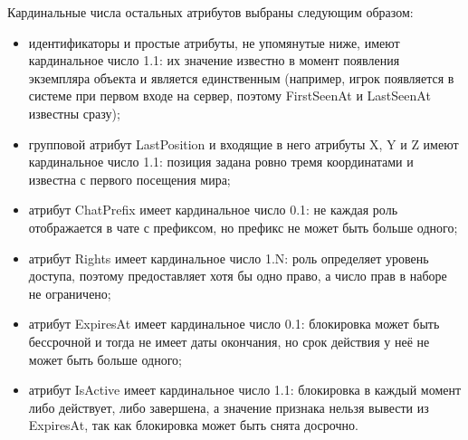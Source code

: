 \documentclass[a4paper, 14pt]{extarticle}
\begin{document}
Кардинальные числа остальных атрибутов выбраны следующим образом:
\begin{itemize}
    \item идентификаторы и простые атрибуты, не упомянутые ниже, имеют кардинальное число 1.1: их значение известно в момент появления экземпляра объекта и является единственным (например, игрок появляется в системе при первом входе на сервер, поэтому FirstSeenAt и LastSeenAt известны сразу);
    \item групповой атрибут LastPosition и входящие в него атрибуты X, Y и Z имеют кардинальное число 1.1: позиция задана ровно тремя координатами и известна с первого посещения мира;
    \item атрибут ChatPrefix имеет кардинальное число 0.1: не каждая роль отображается в чате с префиксом, но префикс не может быть больше одного;
    \item атрибут Rights имеет кардинальное число 1.N: роль определяет уровень доступа, поэтому предоставляет хотя бы одно право, а число прав в наборе не ограничено;
    \item атрибут ExpiresAt имеет кардинальное число 0.1: блокировка может быть бессрочной и тогда не имеет даты окончания, но срок действия у неё не может быть больше одного;
    \item атрибут IsActive имеет кардинальное число 1.1: блокировка в каждый момент либо действует, либо завершена, а значение признака нельзя вывести из ExpiresAt, так как блокировка может быть снята досрочно.
\end{itemize}
\end{document}
